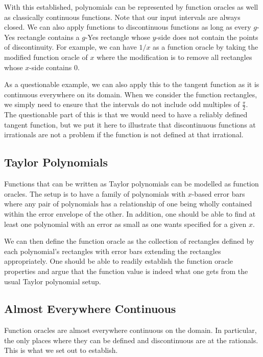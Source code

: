 \documentclass[12pt]{article}
\theoremstyle{remark}
\begin{document}
With this established, polynomials can be represented by function oracles as well as classically continuous functions. Note that our input intervals are always closed. We can also apply functions to discontinuous functions as long as every $g$-Yes rectangle contains a $g$-Yes rectangle whose $y$-side does not contain the points of discontinuity. For example, we can have $1/x$ as a function oracle by taking the modified function oracle of $x$ where the modification is to remove all rectangles whose $x$-side contains 0. 

As a questionable example, we can also apply this to the tangent function as it is continuous everywhere on its domain. When we consider the function rectangles, we simply need to ensure that the intervals do not include odd multiples of $\frac{\pi}{2}$. The questionable part of this is that we would need to have a reliably defined tangent function, but we put it here to illustrate that discontinuous functions at irrationals are not a problem if the function is not defined at that irrational. 


\subsection{Taylor Polynomials}

Functions that can be written as Taylor polynomials can be modelled as function oracles. The setup is to have a family of polynomials with $x$-based error bars where any pair of polynomials has a relationship of one being wholly contained within the error envelope of the other. In addition, one should be able to find at least one polynomial with an error as small as one wants specified for a given $x$. 

We can then define the function oracle as the collection of rectangles defined by each polynomial's rectangles with error bars extending the rectangles appropriately. One should be able to readily establish the function oracle properties and argue that the function value is indeed what one gets from the usual Taylor polynomial setup. 

\subsection{Almost Everywhere Continuous}

Function oracles are almost everywhere continuous on the domain. In particular, the only places where they can be defined and discontinuous are at the rationals. This is what we set out to establish. 
\end{document}

